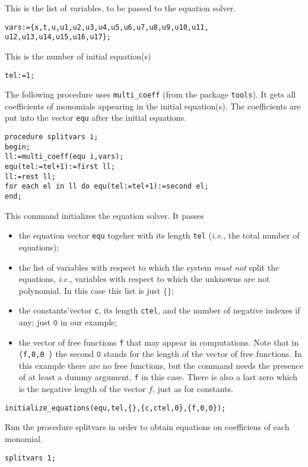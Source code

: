 \documentclass[12pt]{amsart}
\theoremstyle{definition}
\begin{document}
This is the list of variables, to be passed to the equation solver.
\begin{verbatim}
vars:={x,t,u,u1,u2,u3,u4,u5,u6,u7,u8,u9,u10,u11,
u12,u13,u14,u15,u16,u17};
\end{verbatim}

This is the number of initial equation(s)
\begin{verbatim}
tel:=1;
\end{verbatim}

The following procedure uses \texttt{multi\_coeff} (from the package
\texttt{tools}).  It gets all coefficients of monomials appearing in the
initial equation(s).  The coefficients are put into the vector \texttt{equ}
after the initial equations.
\begin{verbatim}
procedure splitvars i;
begin;
ll:=multi_coeff(equ i,vars);
equ(tel:=tel+1):=first ll;
ll:=rest ll;
for each el in ll do equ(tel:=tel+1):=second el;
end;
\end{verbatim}

This command initializes the equation solver.  It passes
\begin{itemize}
  \item the equation vector \texttt{equ} togeher with its length \texttt{tel}
    (\emph{i.e.}, the total number of equations);
  \item the list of variables with respect to which the system \emph{must not}
    split the equations, \emph{i.e.}, variables with respect to which the
    unknowns are not polynomial. In this case this list is just $\{\}$;
  \item the constants'vector \texttt{c}, its length \texttt{ctel}, and the
    number of negative indexes if any; just $\texttt{0}$ in our example;
  \item the vector of free functions \texttt{f} that may appear in
    computations. Note that in \texttt{$\{$f,0,0 $\}$} the second $\texttt{0}$
    stands for the length of the vector of free functions. In this example
    there are no free functions, but the command needs the presence of at least
    a dummy argument, \texttt{f} in this case. There is also a last zero which
    is the negative length of the vector $f$, just as for constants.
  \end{itemize}
\begin{verbatim}
initialize_equations(equ,tel,{},{c,ctel,0},{f,0,0});
\end{verbatim}

Run the procedure splitvars in order to obtain equations on coefficiens
of each monomial.
\begin{verbatim}
splitvars 1;
\end{verbatim}
\end{document}
